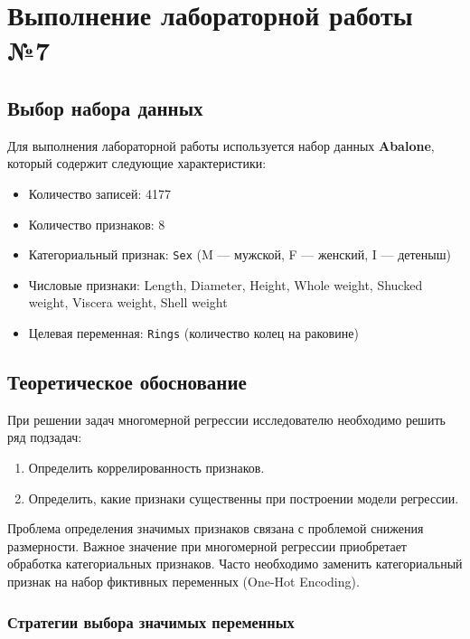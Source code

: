 \chapter{Выполнение лабораторной работы №7}
\label{ch:lab7}

\section{Выбор набора данных}

Для выполнения лабораторной работы используется набор данных \textbf{Abalone}, который содержит следующие характеристики:

\begin{itemize}
    \item Количество записей: 4177
    \item Количество признаков: 8
    \item Категориальный признак: \texttt{Sex} (M --- мужской, F --- женский, I --- детеныш)
    \item Числовые признаки: Length, Diameter, Height, Whole weight, Shucked weight, Viscera weight, Shell weight
    \item Целевая переменная: \texttt{Rings} (количество колец на раковине)
\end{itemize}

\section{Теоретическое обоснование}

При решении задач многомерной регрессии исследователю необходимо решить ряд подзадач:

\begin{enumerate}
    \item Определить коррелированность признаков.
    \item Определить, какие признаки существенны при построении модели регрессии.
\end{enumerate}

Проблема определения значимых признаков связана с проблемой снижения размерности. Важное значение при многомерной регрессии приобретает обработка категориальных признаков. Часто необходимо заменить категориальный признак на набор фиктивных переменных (One-Hot Encoding).

\subsection{Стратегии выбора значимых переменных}

